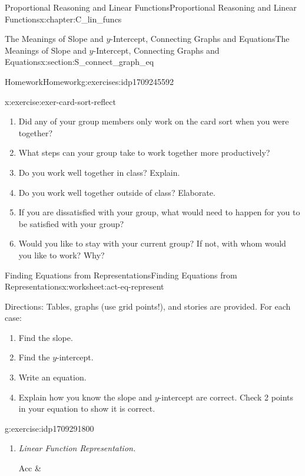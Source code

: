 \documentclass[oneside,10pt,]{book}
\newcommand{\tabularfont}{\relax}
\newcommand{\lititle}[1]{{\slshape#1}}
\numberwithin{equation}{chapter}
\newcommand{\hrulethin}  {\noalign{\hrule height 0.04em}}
\begin{document}
\begin{chapterptx}{Proportional Reasoning and Linear Functions}{}{Proportional Reasoning and Linear Functions}{}{}{x:chapter:C_lin_funcs}
\begin{sectionptx}{The Meanings of Slope and \(y\)-Intercept, Connecting Graphs and Equations}{}{The Meanings of Slope and \(y\)-Intercept, Connecting Graphs and Equations}{}{}{x:section:S_connect_graph_eq}
\begin{exercises-subsection}{Homework}{}{Homework}{}{}{g:exercises:idp1709245592}
\begin{divisionexercise}{6}{}{}{x:exercise:exer-card-sort-reflect}
\begin{enumerate}[font=\bfseries,label=(\alph*),ref=\alph*]
\item{}Did any of your group members only work on the card sort when you were together?%
\item{}What steps can your group take to work together more productively?%
\item{}Do you work well together in class? Explain.%
\item{}Do you work well together outside of class? Elaborate.%
\item{}If you are dissatisfied with your group, what would need to happen for you to be satisfied with your group?%
\item{}Would you like to stay with your current group? If not, with whom would you like to work? Why?%
\end{enumerate}
\end{divisionexercise}%
\end{exercises-subsection}
%
%
\typeout{************************************************}
\typeout{************************************************}
%
\begin{worksheet-subsection}{Finding Equations from Representations}{}{Finding Equations from Representations}{}{}{x:worksheet:act-eq-represent}
\begin{introduction}{}%
Directions: Tables, graphs (use grid points!), and stories are provided. For each case:%
\begin{enumerate}[label=(\alph*)]
\item{}Find the slope.%
\item{}Find the \(y\)-intercept.%
\item{}Write an equation.%
\item{}Explain how you know the slope and \(y\)-intercept are correct. Check 2 points in your equation to show it is correct.%
\end{enumerate}
%
\end{introduction}%
\begin{divisionexercise}{1}{}{}{g:exercise:idp1709291800}%
\begin{enumerate}[font=\bfseries,label=(\alph*),ref=\alph*]
\item{}\lititle{Linear Function Representation.}\par%
\begin{center}%
{\tabularfont%
\begin{tabular}{Acc}\hrulethin
{}&\tabularnewline\hrulethin

\end{tabular}}
\end{center}
\end{enumerate}
\end{divisionexercise}
\end{worksheet-subsection}
\end{sectionptx}
\end{chapterptx}
\end{document}
